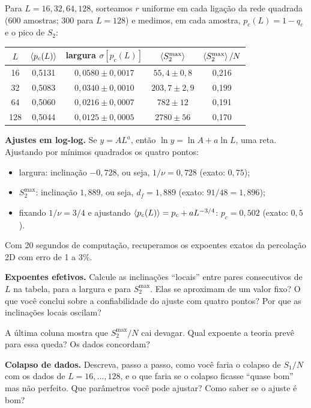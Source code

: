 \documentclass[11pt]{article}
\begin{document}
Para $L = 16, 32, 64, 128$, sorteamos $r$ uniforme em cada ligação da rede quadrada (600 amostras; 300 para $L=128$) e medimos, em cada amostra, $p_c(L) = 1-q_c$ e o pico de $S_2$:
\begin{center}
\begin{tabular}{ccccc}
\toprule
$L$ & $\left\langle p_c(L) \right\rangle$ & largura $\sigma[p_c(L)]$ & $\left\langle S_2^{\max} \right\rangle$ & $\left\langle S_2^{\max} \right\rangle/N$\\
\midrule
16 & 0,5131 & $0{,}0580\pm0{,}0017$ & $55{,}4\pm0{,}8$ & 0,216\\
32 & 0,5083 & $0{,}0340\pm0{,}0010$ & $203{,}7\pm2{,}9$ & 0,199\\
64 & 0,5060 & $0{,}0216\pm0{,}0007$ & $782\pm12$ & 0,191\\
128 & 0,5044 & $0{,}0125\pm0{,}0005$ & $2780\pm56$ & 0,170\\
\bottomrule
\end{tabular}
\end{center}

\begin{ideia}
\textbf{Ajustes em log-log.} Se $y = AL^{a}$, então $\ln y = \ln A + a\ln L$, uma reta. Ajustando por mínimos quadrados os quatro pontos:
\begin{itemize}
  \item largura: inclinação $-0{,}728$, ou seja, $1/\nu = 0{,}728$ (exato: $0{,}75$);
  \item $S_2^{\max}$: inclinação $1{,}889$, ou seja, $d_f = 1{,}889$ (exato: $91/48 = 1{,}896$);
  \item fixando $1/\nu = 3/4$ e ajustando $\left\langle p_c(L) \right\rangle = p_c + aL^{-3/4}$: $p_c = 0{,}502$ (exato: $0{,}5$).
\end{itemize}
Com 20 segundos de computação, recuperamos os expoentes exatos da percolação 2D com erro de 1 a 3\%.
\end{ideia}

 \textbf{Expoentes efetivos.} Calcule as inclinações ``locais'' entre pares consecutivos de $L$ na tabela, para a largura e para $S_2^{\max}$. Elas se aproximam de um valor fixo? O que você conclui sobre a confiabilidade do ajuste com quatro pontos? Por que as inclinações locais oscilam?

 A última coluna mostra que $S_2^{\max}/N$ cai devagar. Qual expoente a teoria prevê para essa queda? Os dados concordam?

 \textbf{Colapso de dados.} Descreva, passo a passo, como você faria o colapso de $S_1/N$ com os dados de $L=16,\dots,128$, e o que faria se o colapso ficasse ``quase bom'' mas não perfeito. Que parâmetros você pode ajustar? Como saber se o ajuste é bom?
\end{document}
